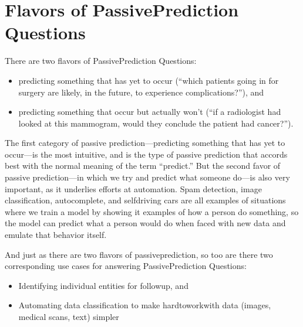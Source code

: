 \documentclass[letterpaper,10pt,english]{jupyterBook}
\begin{document}
\section{Flavors of Passive\sphinxhyphen{}Prediction Questions}
\label{\detokenize{30_questions/20_passive_prediction_questions:flavors-of-passive-prediction-questions}}
\sphinxAtStartPar
There are two flavors of Passive\sphinxhyphen{}Prediction Questions:
\begin{itemize}
\item {} 
\sphinxAtStartPar
predicting something that has yet to occur (“which patients going in for surgery are likely, in the future, to experience complications?”), and

\item {} 
\sphinxAtStartPar
predicting something that  occur but actually won’t (“if a radiologist had looked at this mammogram, would they conclude the patient had cancer?”).

\end{itemize}

\sphinxAtStartPar
The first category of passive prediction—predicting something that has yet to occur—is the most intuitive, and is the type of passive prediction that accords best with the normal meaning of the term “predict.” But the second favor of passive prediction—in which we try and predict what someone  do—is also very important, as it underlies efforts at automation. Spam detection, image classification, autocomplete, and self\sphinxhyphen{}driving cars are all examples of situations where we train a model by showing it examples of how a person  do something, so the model can predict what a person would do when faced with new data and emulate that behavior itself.

\sphinxAtStartPar
And just as there are two flavors of passive\sphinxhyphen{}prediction, so too are there two corresponding use cases for answering Passive\sphinxhyphen{}Prediction Questions:
\begin{itemize}
\item {} 
\sphinxAtStartPar
Identifying individual entities for follow\sphinxhyphen{}up, and

\item {} 
\sphinxAtStartPar
Automating data classification to make hard\sphinxhyphen{}to\sphinxhyphen{}work\sphinxhyphen{}with data (images, medical scans, text) simpler

\end{itemize}
\end{document}
